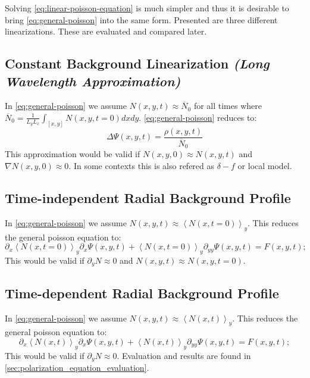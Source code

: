 \documentclass[master.tex]{subfiles}
\begin{document}
Solving \autoref{eq:linear-poisson-equation} is much simpler and thus it is desirable to bring \autoref{eq:general-poisson} into the same form. Presented are three different linearizations. These are evaluated and compared later.

\subsection{Constant Background Linearization \textit{(Long Wavelength Approximation)}}

In \autoref{eq:general-poisson} we assume $N(x,y, t) \approx \overline{N}_0$ for all times where $\overline{N}_0=\frac{1}{L_yL_x}\int_{[x,y]} N(x,y, t = 0) dx dy$. \autoref{eq:general-poisson} reduces to:
\begin{equation}
    \Delta \Psi(x,y,t) = \frac{\rho(x,y,t)}{\overline{N}_0}
\end{equation}
This approximation would be valid if $N(x,y, 0) \approx N(x,y,t)$ and $\nabla N(x,y,0) \approx 0$. In some contexts this is also refered as  $\delta-f$ or local model.

\subsection{Time-independent Radial Background Profile}
In \autoref{eq:general-poisson} we assume $N(x,y,t) \approx \left<N(x,t = 0)\right>_y$. This reduces the general poisson equation to:
\begin{equation}
    \partial_x \left<N(x,t = 0)\right>_y \partial_x \Psi(x,y,t) + \left<N(x,t = 0)\right>_y \partial_{yy} \Psi(x,y,t) = F(x,y,t);
\end{equation}
This would be valid if $\partial_y N \approx 0$ and $N(x,y,t) \approx N(x,y, t= 0)$.

\subsection{Time-dependent Radial Background Profile}
In \autoref{eq:general-poisson} we assume $N(x,y,t) \approx \left<N(x,t)\right>_y$. This reduces the general poisson equation to:
\begin{equation}
    \partial_x \left<N(x,t)\right>_y \partial_x \Psi(x,y,t) + \left<N(x,t)\right>_y \partial_{yy} \Psi(x,y,t) = F(x,y,t);
\end{equation}
This would be valid if $\partial_y N \approx 0$.
\newline
Evaluation and results are found in \autoref{sec:polarization_equation_evaluation}.
\end{document}

